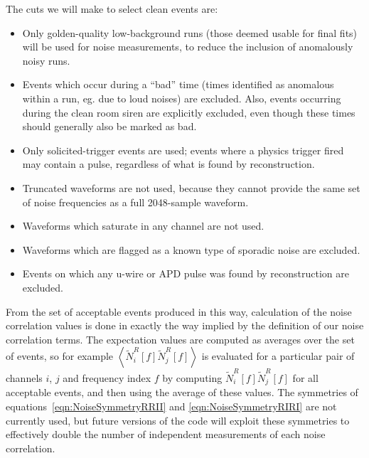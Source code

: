 The cuts we will make to select clean events are:
\begin{itemize}
\item Only golden-quality low-background runs (those deemed usable for final fits) will be used for noise measurements, to reduce the inclusion of anomalously noisy runs.
\item Events which occur during a ``bad'' time (times identified as anomalous within a run, eg. due to loud noises) are excluded.  Also, events occurring during the clean room siren are explicitly excluded, even though these times should generally also be marked as bad.
\item Only solicited-trigger events are used; events where a physics trigger fired may contain a pulse, regardless of what is found by reconstruction.
\item Truncated waveforms are not used, because they cannot provide the same set of noise frequencies as a full 2048-sample waveform.
\item Waveforms which saturate in any channel are not used.
\item Waveforms which are flagged as a known type of sporadic noise are excluded.
\item Events on which any u-wire or APD pulse was found by reconstruction are excluded.
\end{itemize}

From the set of acceptable events produced in this way, calculation of the noise correlation values is done in exactly the way implied by the definition of our noise correlation terms.  The expectation values are computed as averages over the set of events, so for example $\left<\widetilde{N}^R_i[f] \widetilde{N}^R_j[f]\right>$ is evaluated for a particular pair of channels $i$, $j$ and frequency index $f$ by computing $\widetilde{N}^R_i[f] \widetilde{N}^R_j[f]$ for all acceptable events, and then using the average of these values.  The symmetries of equations~\ref{eqn:NoiseSymmetryRRII} and \ref{eqn:NoiseSymmetryRIRI} are not currently used, but future versions of the code will exploit these symmetries to effectively double the number of independent measurements of each noise correlation.

